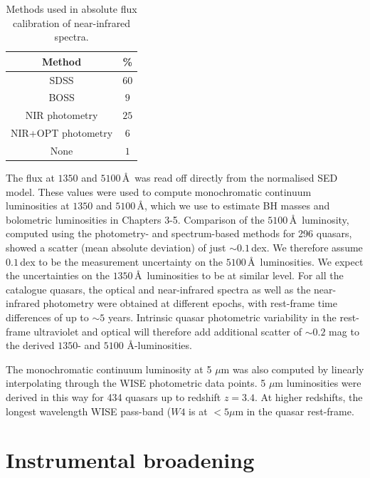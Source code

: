 \begin{table}
  \centering
  \footnotesize 
  \caption{Methods used in absolute flux calibration of near-infrared spectra.}
  \label{tab:flux_calibration}
    \begin{tabular}{cc} 
    \hline
    Method & \% \\
    \hline
    SDSS               & $60$ \\
    BOSS               & $9$ \\
    NIR photometry     & $25$ \\
    NIR+OPT photometry & $6$ \\
    None               & $1$ \\    
    \hline
    \end{tabular}
\end{table} 

The flux at $1350$ and $5100$\,\AA\, was read off directly from the normalised SED model.
These values were used to compute monochromatic continuum luminosities at $1350$ and $5100$\,\AA, which we use to estimate BH masses and bolometric luminosities in Chapters 3-5. 
Comparison of the $5100$\,\AA\, luminosity, computed using the photometry- and spectrum-based methods for 296 quasars, showed a scatter (mean absolute deviation) of just $\sim0.1$\,dex.
We therefore assume $0.1$\,dex to be the measurement uncertainty on the $5100$\,\AA\, luminosities.
We expect the uncertainties on the $1350$\,\AA\, luminosities to be at similar level.  
For all the catalogue quasars, the optical and near-infrared spectra as well as the near-infrared photometry were obtained at different epochs, with rest-frame time differences of up to $\sim5$ years. 
Intrinsic quasar photometric variability in the rest-frame ultraviolet and optical will therefore add additional scatter of $\sim0.2$ mag \citep[e.g.][]{macleod10} to the derived $1350$- and $5100$ \AA-luminosities.

The monochromatic continuum luminosity at 5 $\mu$m was also computed by linearly interpolating through the WISE photometric data points. 
5 $\mu$m luminosities were derived in this way for 434 quasars up to redshift $z=3.4$. 
At higher redshifts, the longest wavelength WISE pass-band ($W4$ is at $<5\mu$m in the quasar rest-frame.

\section{Instrumental broadening}


